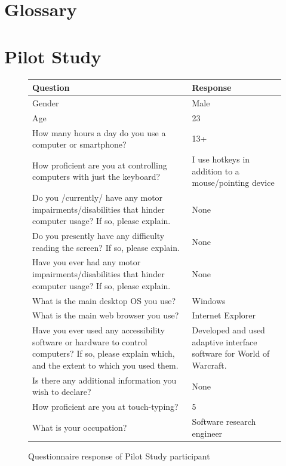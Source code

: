 \documentclass[a4paper, 12pt]{report}
\begin{document}
\pagebreak
\chapter{Glossary}
\printglossary

\clearpage


{}
\printbibliography

\clearpage
{}
{}
\appendix
\chapter{Pilot Study}

\begin{figure}[ht]
\renewcommand{\arraystretch}{1.5}

\begin{tabularx}{\textwidth}{X|X}
\hline\hline %
Question & Response \\ [0.5ex] %
\hline
Gender	&	Male	\\
Age	&	23	\\
How many hours a day do you use a computer or smartphone?	&	13+	\\
How proficient are you at controlling computers with just the keyboard?	&	I use hotkeys in addition to a mouse/pointing device	\\
Do you /currently/ have any motor impairments/disabilities that hinder computer usage? If so, please explain.	&	None	\\
Do you presently have any difficulty reading the screen? If so, please explain.	&	None	\\
Have you ever had any motor impairments/disabilities that hinder computer usage? If so, please explain.	&	None	\\
What is the main desktop OS you use?	&	Windows	\\
What is the main web browser you use?	&	Internet Explorer	\\
Have you ever used any accessibility software or hardware to control computers? If so, please explain which, and the extent to which you used them.	&	Developed and used adaptive interface software for World of Warcraft.	\\
Is there any additional information you wish to declare?	&	None	\\
How proficient are you at touch-typing?	&	5	\\
What is your occupation?	&	Software research engineer	\\ [1ex] %
\hline %
\end{tabularx}
\caption{Questionnaire response of Pilot Study participant}
\label{fig:partic_pilotpre}
\end{figure}
\end{document}
